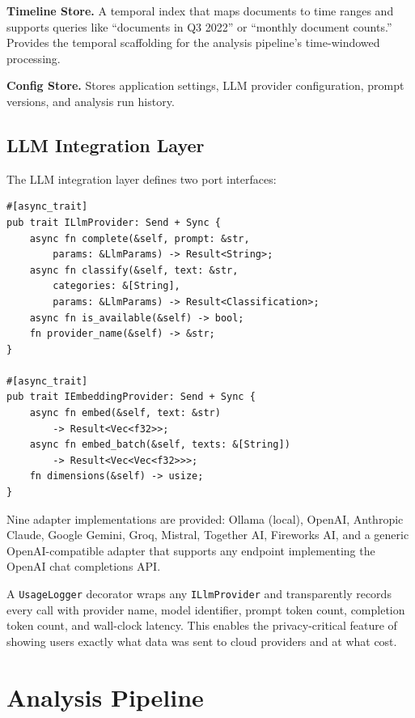 \documentclass[manuscript,review]{acmart}
\begin{document}
\textbf{Timeline Store.}
A temporal index that maps documents to time ranges and supports queries like ``documents in Q3 2022'' or ``monthly document counts.''
Provides the temporal scaffolding for the analysis pipeline's time-windowed processing.

\textbf{Config Store.}
Stores application settings, LLM provider configuration, prompt versions, and analysis run history.

\subsection{LLM Integration Layer}
\label{sec:llm-integration}

The LLM integration layer defines two port interfaces:

\begin{lstlisting}[caption={LLM port interfaces (Rust).},label={lst:llm-ports}]
#[async_trait]
pub trait ILlmProvider: Send + Sync {
    async fn complete(&self, prompt: &str,
        params: &LlmParams) -> Result<String>;
    async fn classify(&self, text: &str,
        categories: &[String],
        params: &LlmParams) -> Result<Classification>;
    async fn is_available(&self) -> bool;
    fn provider_name(&self) -> &str;
}

#[async_trait]
pub trait IEmbeddingProvider: Send + Sync {
    async fn embed(&self, text: &str)
        -> Result<Vec<f32>>;
    async fn embed_batch(&self, texts: &[String])
        -> Result<Vec<Vec<f32>>>;
    fn dimensions(&self) -> usize;
}
\end{lstlisting}

Nine adapter implementations are provided: Ollama (local), OpenAI, Anthropic Claude, Google Gemini, Groq, Mistral, Together AI, Fireworks AI, and a generic OpenAI-compatible adapter that supports any endpoint implementing the OpenAI chat completions API.

A \texttt{UsageLogger} decorator wraps any \texttt{ILlmProvider} and transparently records every call with provider name, model identifier, prompt token count, completion token count, and wall-clock latency.
This enables the privacy-critical feature of showing users exactly what data was sent to cloud providers and at what cost.

\section{Analysis Pipeline}
\label{sec:pipeline}
\end{document}
